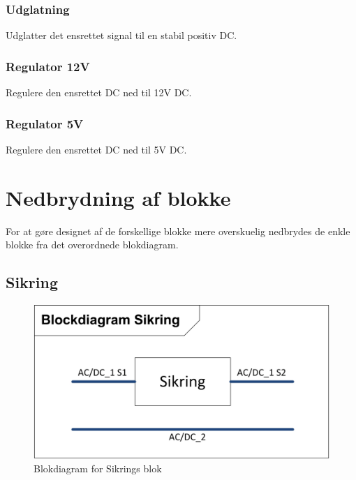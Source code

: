 \subsubsection{Udglatning}
Udglatter det ensrettet signal til en stabil positiv DC. 
\subsubsection{Regulator 12V}
Regulere den ensrettet DC ned til 12V DC.
\subsubsection{Regulator 5V}
Regulere den ensrettet DC ned til 5V DC.
\newpage
\section{Nedbrydning af blokke}
For at gøre designet af de forskellige blokke mere overskuelig nedbrydes de enkle blokke fra det overordnede blokdiagram.
\subsection{Sikring}
\begin{figure}[H]
\centering
\includegraphics[scale=1]{billeder/SikringsBlok}
\caption{Blokdiagram for Sikrings blok}
\label{fig:SikringsBlok}
\end{figure}

